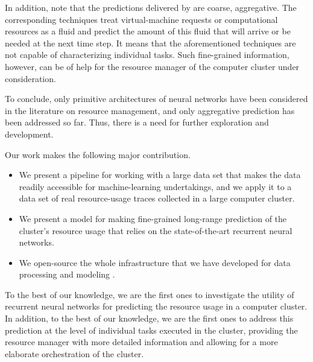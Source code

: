 In addition, note that the predictions delivered by \cite{dabbagh2015,
ismaeel2015, cao2014} are coarse, aggregative. The corresponding techniques
treat virtual-machine requests or computational resources as a fluid and predict
the amount of this fluid that will arrive or be needed at the next time step. It
means that the aforementioned techniques are not capable of characterizing
individual tasks. Such fine-grained information, however, can be of help for the
resource manager of the computer cluster under consideration.

To conclude, only primitive architectures of neural networks have been
considered in the literature on resource management, and only aggregative
prediction has been addressed so far. Thus, there is a need for further
exploration and development.

Our work makes the following major contribution.
\begin{itemize}
\item We present a pipeline for working with a large data set that makes the
data readily accessible for machine-learning undertakings, and we apply it to a
data set of real resource-usage traces collected in a large computer cluster.

\item We present a model for making fine-grained long-range prediction of the
cluster's resource usage that relies on the state-of-the-art recurrent neural
networks.

\item We open-source the whole infrastructure that we have developed for data
processing and modeling \cite{sources}.
\end{itemize}
To the best of our knowledge, we are the first ones to investigate the utility
of recurrent neural networks for predicting the resource usage in a computer
cluster. In addition, to the best of our knowledge, we are the first ones to
address this prediction at the level of individual tasks executed in the
cluster, providing the resource manager with more detailed information and
allowing for a more elaborate orchestration of the cluster.

